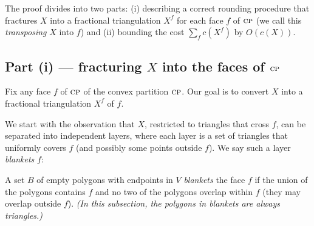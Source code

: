 \documentclass[final]{siamltex}
\newcommand{\transposal}[2]{{#1}^{#2}}
\newcommand{\blanket}{B} \newcommand{\blanketSet}{{\cal B}} \newcommand{\convPart}{\text{\sc cp}}
\newcommand{\cost}{c}
\newcommand{\face}{f}
\newcommand{\vertices}{V}
\newcommand{\fracTriang}{X}
\begin{document}
The proof divides into two parts:
(i) describing a correct rounding procedure that fractures $\fracTriang$ 
into a fractional triangulation $\transposal{\fracTriang}{\face}$ 
for each face $\face$ of $\convPart$
(we call this {\em transposing} $\fracTriang$ into $\face$)
and
(ii) bounding the cost $\sum_\face \cost(\transposal{\fracTriang}{\face})$ by $O(\cost(\fracTriang))$.

\subsection{Part (i) --- fracturing $\fracTriang$ into the faces of $\convPart$}
\label{sec:part i} \label{sec:feasibility}
Fix any face $\face$ of $\convPart$ of the convex partition $\convPart$.
Our goal is to convert $\fracTriang$ into a fractional triangulation
$\transposal{\fracTriang}{\face}$ of $\face$.

We start with the observation that $\fracTriang$, restricted to triangles that cross $\face$,
can be separated into independent layers, 
where each layer is a set of triangles that uniformly covers $\face$
(and possibly some points outside $\face$).
We say such a layer {\em blankets} $\face$:
\begin{definition}[blanket]\label{def:blanket}
A set $\blanket$ of empty polygons with endpoints in $\vertices$
  {\em blankets} the face $\face$ 
  if the union of the polygons contains $\face$
  and no two of the polygons overlap within $\face$
  (they may overlap outside $\face$).
  {\em (In this subsection, the polygons in blankets are always triangles.)}
\end{definition}
\end{document}
